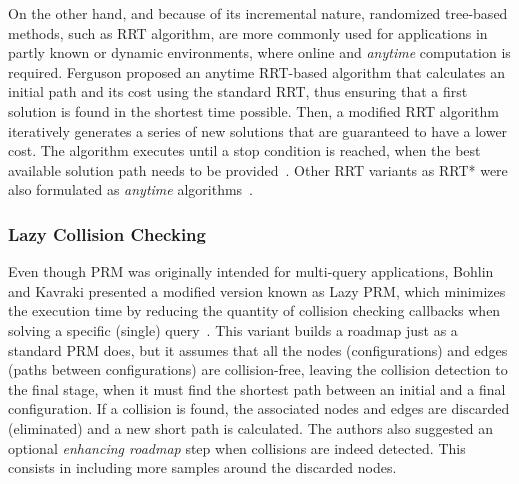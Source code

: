 On the other hand, and because of its incremental nature, randomized tree-based
methods, such as \ac{RRT} algorithm, are more commonly used for applications in
partly known or dynamic environments, where online and \textit{anytime}
computation is required. Ferguson \etal proposed an anytime RRT-based algorithm
that calculates an initial path and its cost using the standard \ac{RRT}, thus
ensuring that a first solution is found in the shortest time possible. Then, a
modified \ac{RRT} algorithm iteratively generates a series of new solutions that
are guaranteed to have a lower cost. The algorithm executes until a stop
condition is reached, \eg when the best available solution path needs to be
provided~\cite{Ferguson2006,Ferguson2007}. Other RRT variants as \ac{RRT*} were
also formulated as \textit{anytime} algorithms~\cite{Karaman2011a}.

% 

\subsubsection{Lazy Collision Checking}
\label{sec:lazy_collision_check}

Even though \ac{PRM} was originally intended for multi-query applications,
Bohlin and Kavraki presented a modified version known as Lazy PRM, which
minimizes the execution time by reducing the quantity of collision checking
callbacks when solving a specific (single) query~\cite{Bohlin2000,Bohlin2001}.
This variant builds a roadmap just as a standard \ac{PRM} does, but it assumes
that all the nodes (configurations) and edges (paths between configurations) are
collision-free, leaving the collision detection to the final stage, \ie when it
must find the shortest path between an initial and a final configuration. If a
collision is found, the associated nodes and edges are discarded (eliminated)
and a new short path is calculated. The authors also suggested an optional
\textit{enhancing roadmap} step when collisions are indeed detected. This
consists in including more samples around the discarded nodes.

